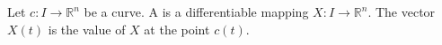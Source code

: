 Let $c: I \rightarrow \mathbb{R}^n$ be a curve. A  is a differentiable mapping $X: I \rightarrow \mathbb{R}^n$. The vector $X(t)$ is the value of $X$ at the point $c(t)$.

